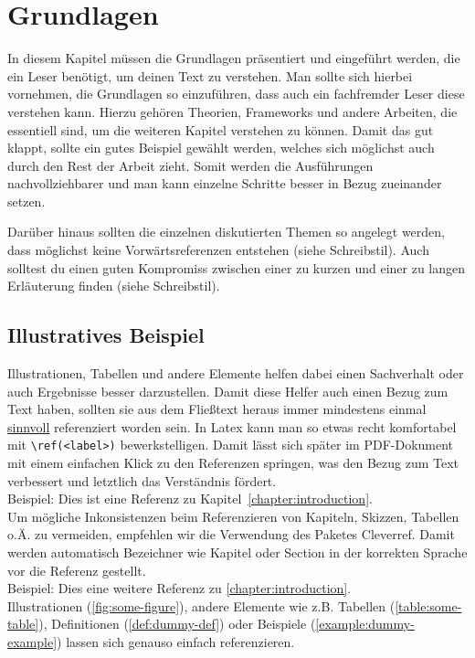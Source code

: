 
\chapter{Grundlagen}\label{chapter:background}
In diesem Kapitel müssen die Grundlagen präsentiert und eingeführt werden, die ein Leser benötigt, um deinen Text zu verstehen.
Man sollte sich hierbei vornehmen, die Grundlagen so einzuführen, dass auch ein fachfremder Leser diese verstehen kann.
Hierzu gehören Theorien, Frameworks und andere Arbeiten, die essentiell sind, um die weiteren Kapitel verstehen zu können. 
Damit das gut klappt, sollte ein gutes Beispiel gewählt werden, welches sich möglichst auch durch den Rest der Arbeit zieht.
Somit werden die Ausführungen nachvollziehbarer und man kann einzelne Schritte besser in Bezug zueinander setzen.

Darüber hinaus sollten die einzelnen diskutierten Themen so angelegt werden, dass möglichst keine Vorwärtsreferenzen entstehen (siehe Schreibstil). 
Auch solltest du einen guten Kompromiss zwischen einer zu kurzen und einer zu langen Erläuterung finden (siehe Schreibstil).



\section{Illustratives Beispiel}\label{sect:motivating-examples}
Illustrationen, Tabellen und andere Elemente helfen dabei einen Sachverhalt oder auch Ergebnisse besser darzustellen. Damit diese Helfer auch einen Bezug zum Text haben, sollten sie aus dem Fließtext heraus immer mindestens einmal \underline{sinnvoll} referenziert worden sein.
In Latex kann man so etwas recht komfortabel mit \lstinline|\ref(<label>)| bewerkstelligen. Damit lässt sich später im PDF-Dokument mit einem einfachen Klick zu den Referenzen springen, was den Bezug zum Text verbessert und letztlich das Verständnis fördert.\\
Beispiel: Dies ist eine Referenz zu Kapitel~\ref{chapter:introduction}.\\ 
Um mögliche Inkonsistenzen beim Referenzieren von Kapiteln, Skizzen, Tabellen o.Ä. zu vermeiden, empfehlen wir die Verwendung des Paketes Cleverref. Damit werden automatisch Bezeichner wie \glqq Kapitel\grqq{} oder \glqq Section\grqq{} in der korrekten Sprache vor die Referenz gestellt.\\
Beispiel: Dies eine weitere Referenz zu \cref{chapter:introduction}.\\
Illustrationen (\cref{fig:some-figure}), andere Elemente wie z.B. Tabellen (\cref{table:some-table}), Definitionen (\cref{def:dummy-def}) oder Beispiele (\cref{example:dummy-example}) lassen sich genauso einfach referenzieren.

